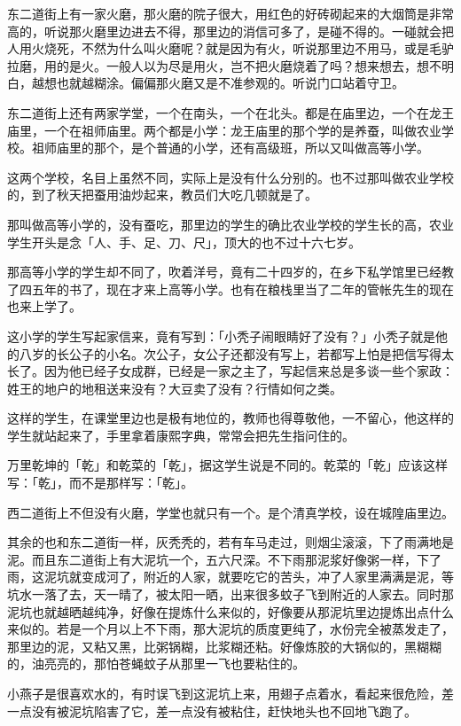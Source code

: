 \documentclass[UTF8]{ctexart}
\begin{document}
东二道街上有一家火磨，那火磨的院子很大，用红色的好砖砌起来的大烟筒是非常高的，听说那火磨里边进去不得，那里边的消信可多了，是碰不得的。一碰就会把人用火烧死，不然为什么叫火磨呢？就是因为有火，听说那里边不用马，或是毛驴拉磨，用的是火。一般人以为尽是用火，岂不把火磨烧着了吗？想来想去，想不明白，越想也就越糊涂。偏偏那火磨又是不准参观的。听说门口站着守卫。

东二道街上还有两家学堂，一个在南头，一个在北头。都是在庙里边，一个在龙王庙里，一个在祖师庙里。两个都是小学：龙王庙里的那个学的是养蚕，叫做农业学校。祖师庙里的那个，是个普通的小学，还有高级班，所以又叫做高等小学。

这两个学校，名目上虽然不同，实际上是没有什么分别的。也不过那叫做农业学校的，到了秋天把蚕用油炒起来，教员们大吃几顿就是了。

那叫做高等小学的，没有蚕吃，那里边的学生的确比农业学校的学生长的高，农业学生开头是念「人、手、足、刀、尺」，顶大的也不过十六七岁。

那高等小学的学生却不同了，吹着洋号，竟有二十四岁的，在乡下私学馆里已经教了四五年的书了，现在才来上高等小学。也有在粮栈里当了二年的管帐先生的现在也来上学了。

这小学的学生写起家信来，竟有写到：「小秃子闹眼睛好了没有？」小秃子就是他的八岁的长公子的小名。次公子，女公子还都没有写上，若都写上怕是把信写得太长了。因为他已经子女成群，已经是一家之主了，写起信来总是多谈一些个家政：姓王的地户的地租送来没有？大豆卖了没有？行情如何之类。

这样的学生，在课堂里边也是极有地位的，教师也得尊敬他，一不留心，他这样的学生就站起来了，手里拿着康熙字典，常常会把先生指问住的。

万里乾坤的「乾」和乾菜的「乾」，据这学生说是不同的。乾菜的「乾」应该这样写：「乾」，而不是那样写：「乾」。

西二道街上不但没有火磨，学堂也就只有一个。是个清真学校，设在城隍庙里边。

其余的也和东二道街一样，灰秃秃的，若有车马走过，则烟尘滚滚，下了雨满地是泥。而且东二道街上有大泥坑一个，五六尺深。不下雨那泥浆好像粥一样，下了雨，这泥坑就变成河了，附近的人家，就要吃它的苦头，冲了人家里满满是泥，等坑水一落了去，天一晴了，被太阳一晒，出来很多蚊子飞到附近的人家去。同时那泥坑也就越晒越纯净，好像在提炼什么来似的，好像要从那泥坑里边提炼出点什么来似的。若是一个月以上不下雨，那大泥坑的质度更纯了，水份完全被蒸发走了，那里边的泥，又粘又黑，比粥锅糊，比浆糊还粘。好像炼胶的大锅似的，黑糊糊的，油亮亮的，那怕苍蝇蚊子从那里一飞也要粘住的。

小燕子是很喜欢水的，有时误飞到这泥坑上来，用翅子点着水，看起来很危险，差一点没有被泥坑陷害了它，差一点没有被粘住，赶快地头也不回地飞跑了。
\end{document}
